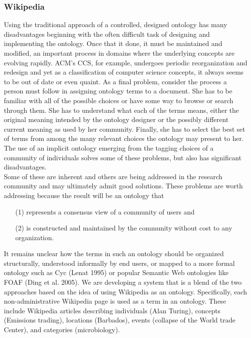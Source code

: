 \subsubsection{Wikipedia}
Using the traditional approach of a controlled, designed ontology has many disadvantages beginning with the often difficult task of designing and implementing the ontology. Once that it done, it must be maintained and modified, an important process in domains where the underlying concepts are evolving rapidly. ACM’s CCS, for example, undergoes periodic reorganization and redesign and yet as a classification of computer science concepts, it always seems to be out of date or even quaint. As a final problem, consider the process a person must follow in assigning ontology terms to a document. She has to be familiar with all of the possible choices or have some way to browse or search through them. She has to understand what each of the terms means, either the original meaning intended by the ontology designer or the possibly different current meaning as used by her community. Finally, she has to select the best set of terms from among the many relevant choices the ontology may present to her. The use of an implicit ontology emerging from the tagging choices of a community of individuals solves some of these problems, but also has significant disadvantages\citep{wiki_1}.\\
Some of these are inherent and others are being addressed in the research community and may ultimately admit good solutions. These problems are worth addressing because the result will be an ontology that 
\begin{itemize} \item [(1)] represents a consensus view of a community of users and \item [(2)]  is constructed and maintained by the community without cost to any organization. 
\end{itemize}
It remains unclear how the terms in such an ontology should be organized structurally, understood informally by end users, or mapped to a more formal ontology such as Cyc (Lenat 1995) or popular Semantic Web ontologies like FOAF (Ding et al. 2005). 
We are developing a system that is a blend of the two approaches based on the idea of using Wikipedia as an ontology. Specifically, each non-administrative Wikipedia page is used as a term in an ontology. These include Wikipedia articles describing individuals (Alan Turing), concepts (Emissions trading), locations (Barbados), events (collapse of the World trade Center), and categories (microbiology). 
